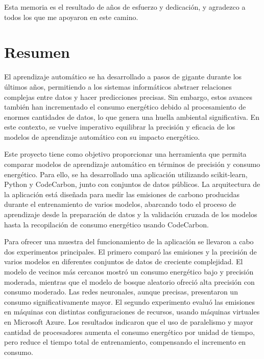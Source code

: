\documentclass[a4paper, 12pt, oneside]{book}
\begin{document}
Esta memoria es el resultado de años de esfuerzo y dedicación, y agradezco a todos los que me apoyaron en este camino.


\chapter*{Resumen}
\thispagestyle{empty}

El aprendizaje automático se ha desarrollado a pasos de gigante durante los últimos años, permitiendo a los sistemas informáticos abstraer relaciones complejas entre datos y hacer predicciones precisas. Sin embargo, estos avances también han incrementado el consumo energético debido al procesamiento de enormes cantidades de datos, lo que genera una huella ambiental significativa. En este contexto, se vuelve imperativo equilibrar la precisión y eficacia de los modelos de aprendizaje automático con su impacto energético.

Este proyecto tiene como objetivo proporcionar una herramienta que permita comparar modelos de aprendizaje automático en términos de precisión y consumo energético. Para ello, se ha desarrollado una aplicación utilizando scikit-learn, Python y CodeCarbon, junto con conjuntos de datos públicos. La arquitectura de la aplicación está diseñada para medir las emisiones de carbono producidas durante el entrenamiento de varios modelos, abarcando todo el proceso de aprendizaje desde la preparación de datos y la validación cruzada de los modelos hasta la recopilación de consumo energético usando CodeCarbon.

Para ofrecer una muestra del funcionamiento de la aplicación se llevaron a cabo dos experimentos principales. El primero comparó las emisiones y la precisión de varios modelos en diferentes conjuntos de datos de creciente complejidad. El modelo de vecinos más cercanos mostró un consumo energético bajo y precisión moderada, mientras que el modelo de bosque aleatorio ofreció alta precisión con consumo moderado. Las redes neuronales, aunque precisas, presentaron un consumo significativamente mayor. El segundo experimento evaluó las emisiones en máquinas con distintas configuraciones de recursos, usando máquinas virtuales en Microsoft Azure. Los resultados indicaron que el uso de paralelismo y mayor cantidad de procesadores aumenta el consumo energético por unidad de tiempo, pero reduce el tiempo total de entrenamiento, compensando el incremento en consumo.
\end{document}
